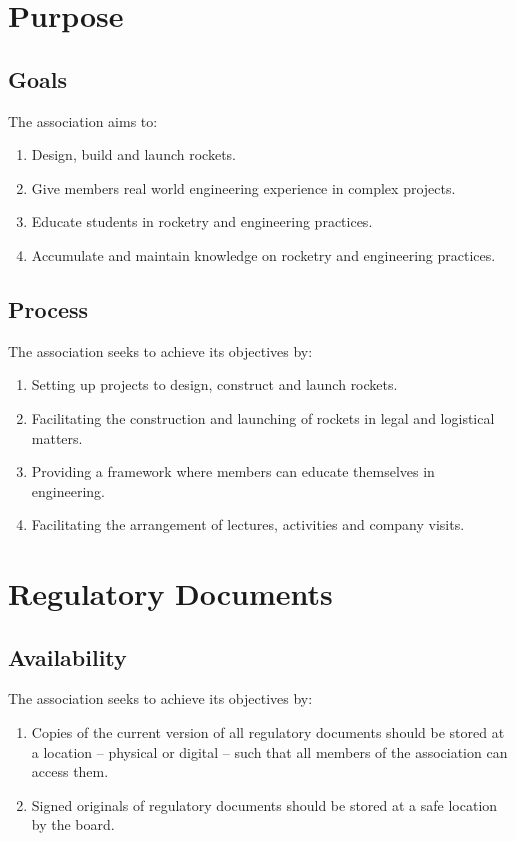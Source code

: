 \section*{Purpose}

\subsection{Goals}
The association aims to:
\begin{enumerate}
  \item Design, build and launch rockets.
  \item Give members real world engineering experience in complex projects.
  \item Educate students in rocketry and engineering practices.
  \item Accumulate and maintain knowledge on rocketry and engineering practices.
\end{enumerate}

\subsection{Process}
The association seeks to achieve its objectives by: 
\begin{enumerate}
  \item Setting up projects to design, construct and launch rockets.
  \item Facilitating the construction and launching of rockets in legal and logistical matters.
  \item Providing a framework where members can educate themselves in engineering.
  \item Facilitating the arrangement of lectures, activities and company visits.
\end{enumerate}

\section*{Regulatory Documents}
\subsection{Availability}
The association seeks to achieve its objectives by: 
\begin{enumerate}
  \item Copies of the current version of all regulatory documents should be stored at a location – physical or digital – such that all members of the association can access them.
  \item Signed originals of regulatory documents should be stored at a safe location by the board.
\end{enumerate}

